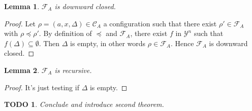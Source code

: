 \documentclass[a4paper,10pt]{report}
\newtheorem{lm}{Lemma}
\newtheorem{td}{TODO}
\theoremstyle{remark}
\newcommand{\C}{\mathcal{C}_{A}}
\newcommand{\F}{\mathcal{F}_{A}}
\newcommand{\Y}{\mathcal{Y}^{n}}
\begin{document}
\begin{lm} \label{cd5}
  $\F$ is downward closed. 
\end{lm}
\begin{proof}
  Let $\rho=(a,x,\Delta) \in \C$ a configuration such that there exist $\rho' \in \F$ with $\rho \preceq \rho'$.
  By definition of $\preceq$ and $\F$, there exist $f$ in $\Y$ such that $f(\Delta) \subseteq \emptyset$.
  Then $\Delta$ is empty, in other words $\rho \in \F$.
  Hence $\F$ is downward closed. 
\end{proof}

\begin{lm} \label{cd6}
  $\F$ is recursive.
\end{lm}

\begin{proof}
  It's just testing if $\Delta$ is empty.
\end{proof}

\begin{td}
 Conclude and introduce second theorem.
\end{td}
\end{document}

